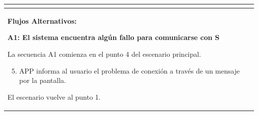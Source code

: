 \begin{longtable}{|l|p{5.5cm}|l|p{2cm}|l|p{1.9cm}|}
{					} \\ \hline

					\multicolumn{6}{|p{15cm}|}{ \textbf{Flujos Alternativos: }
					
					\textbf{A1: El sistema encuentra algún fallo para comunicarse con S}
					
					La secuencia A1 comienza en el punto 4 del escenario principal.
					\begin{enumerate}
							\setcounter{enumi}{4}
							\item APP informa al usuario el problema de conexión a través de un mensaje por la pantalla.
					\end{enumerate}

					El escenario vuelve al punto 1.

					} \\ \hline

			\end{longtable}
